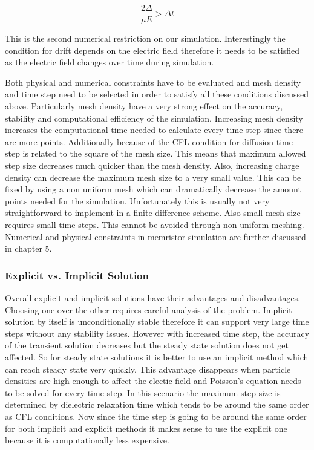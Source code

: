 \begin{equation}
\frac{2 \Delta }{\mu E}>\Delta t
\label{CFL_Drift}
\end{equation}

This is the second numerical restriction on our simulation. Interestingly the condition for drift depends on the electric field therefore it needs to be satisfied as the electric field changes over time during simulation.

Both physical and numerical constraints have to be evaluated and mesh density and time step need to be selected in order to satisfy all these conditions discussed above. Particularly mesh density have a very strong effect on the accuracy, stability and computational efficiency of the simulation. Increasing mesh density increases the computational time needed to calculate every time step since there are more points. Additionally because of the CFL condition for diffusion time step is related to the square of the mesh size. This means that maximum allowed step size decreases much quicker than the mesh density. Also, increasing charge density can decrease the maximum mesh size to a very small value. This can be fixed by using a non uniform mesh which can dramatically decrease the amount points needed for the simulation. Unfortunately this is usually not very straightforward to implement in a finite difference scheme. Also small mesh size requires small time steps. This cannot be avoided through non uniform meshing. Numerical and physical constraints in memristor simulation are further discussed in chapter 5.

\subsubsection{Explicit vs. Implicit Solution}

Overall explicit and implicit solutions have their advantages and disadvantages. Choosing one over the other requires careful analysis of the problem. Implicit solution by itself is unconditionally stable therefore it can support very large time steps without any stability issues. However with increased time step, the accuracy of the transient solution decreases but the steady state solution does not get affected. So for steady state solutions it is better to use an implicit method which can reach steady state very quickly. This advantage disappears when particle densities are high enough to affect the electic field and Poisson's equation needs to be solved for every time step. In this scenario the maximum step size is determined by dielectric relaxation time which tends to be around the same order as CFL conditions. Now since the time step is going to be around the same order for both implicit and explicit methods it makes sense to use the explicit one because it is computationally less expensive.

